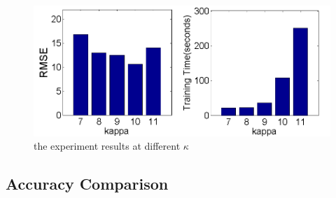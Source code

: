 \documentclass[twoside,leqno,twocolumn]{article}
\begin{document}
\begin{figure}[!htb]
\centerline{
\includegraphics[width=0.9\linewidth]{pictures/kappa.png}
}
\caption{\label{fig:kappa}the experiment results at different $\kappa$}
\end{figure}
\subsection{Accuracy Comparison}
%
%
\end{document}
